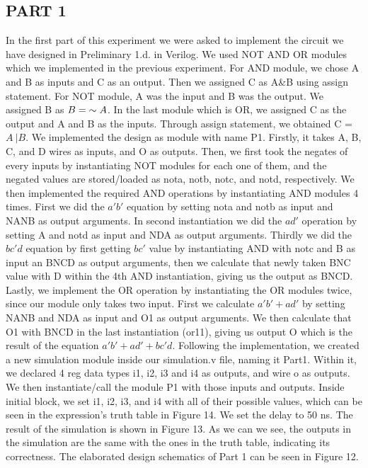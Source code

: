 \documentclass[pdftex,12pt,a4paper]{article}
\begin{document}
\subsection{PART 1}
In the first part of this experiment we were asked to implement the circuit we have designed in Preliminary 1.d. in Verilog. We used NOT AND OR modules which we implemented in the previous experiment. For AND module, we chose A and B as inputs and C as an output. Then we assigned C as A\&B using assign statement. For NOT module, A was the input and B was the output. We assigned B as \(B = \hspace{1mm}\sim{A}\). In the last module which is OR, we assigned C as the output and A and B as the inputs. Through assign statement, we obtained C = \(A \ | B\). We implemented the design as module with name P1. Firstly, it takes A, B, C, and D wires as inputs, and O as outputs. Then, we first took the negates of every inputs by instantiating NOT modules for each one of them, and the negated values are stored/loaded as nota, notb, notc, and notd, respectively. We then implemented the required AND operations by instantiating AND modules 4 times. First we did the \(a'b'\) equation by setting nota and notb as input and NANB as output arguments. In second instantiation we did the \(ad'\) operation by setting A and notd as input and NDA as output arguments. Thirdly we did the \(bc'd\) equation by first getting \(bc'\) value by instantiating AND with notc and B as input an BNCD as output arguments, then we calculate that newly taken BNC value with D within the 4th AND instantiation, giving us the output as BNCD. Lastly, we implement the OR operation by instantiating the OR modules twice, since our module only takes two input. First we calculate \(a'b' + ad'\) by setting NANB and NDA as input and O1 as output arguments. We then calculate that O1 with BNCD in the last instantiation (or11), giving us output O which is the result of the equation \(a'b' + ad' + bc'd\). Following the implementation, we created a new simulation module inside our simulation.v file, naming it Part1. Within it, we declared 4 reg data types i1, i2, i3 and i4 as outputs, and wire o as outputs. We then instantiate/call the module P1 with those inputs and outputs. Inside initial block, we set i1, i2, i3, and i4 with all of their possible values, which can be seen in the expression's truth table in Figure 14. We set the delay to 50 ns. The result of the simulation is shown in Figure 13. As we can we see, the outputs in the simulation are the same with the ones in the truth table, indicating its correctness. The elaborated design schematics of Part 1 can be seen in Figure 12.
\end{document}
